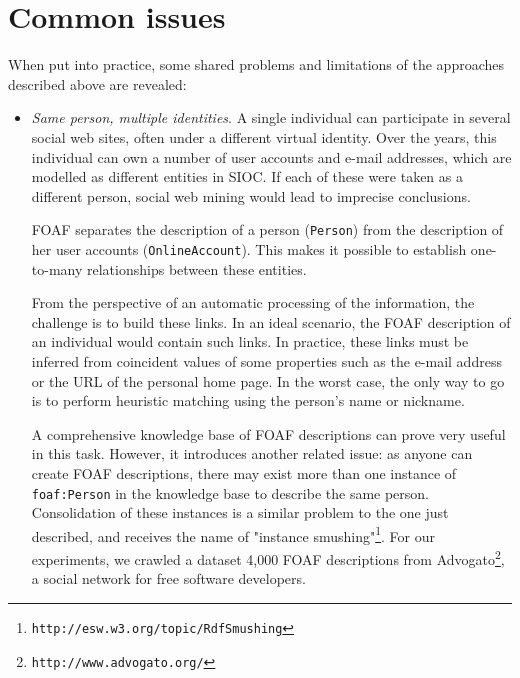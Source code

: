 \documentclass{../templates/www2008-submission}
\begin{document}
\section{Common issues}\label{sec:problems}

When put into practice, some shared problems and limitations
of the approaches described above are revealed:

\begin{itemize}
  \item \emph{Same person, multiple identities}. A single individual can
        participate in several social web sites, often under a different
        virtual identity. Over the years, this individual can own a
        number of user accounts and e-mail addresses, which are modelled
        as different entities in SIOC. If each of these were taken as
        a different person, social web mining would lead to imprecise
        conclusions.

        FOAF separates the description of a person
        (\texttt{Person})
        from the description of her user accounts (\texttt{OnlineAccount}).
        This makes it possible to establish one-to-many relationships
        between these entities.


        From the perspective of an automatic processing of the
        information, the challenge is to build these links. In an
        ideal scenario, the FOAF description of an individual would
        contain such links. In practice, these links must be
        inferred from coincident values of some properties such
        as the e-mail address or the URL of the personal home page.
        In the worst case, the only way to go is to perform heuristic matching
        using the person's name or nickname.

        A comprehensive knowledge base of FOAF descriptions can prove
        very useful in this task. However, it introduces another related issue:
        as anyone can create FOAF descriptions, there may exist more than
        one instance of \texttt{foaf:Person} in the knowledge base
        to describe the same person.
        Consolidation of these instances is a similar problem to the
        one just described, and receives the name of "instance
        smushing"\footnote{\texttt{http://esw.w3.org/topic/RdfSmushing}}.
        For our experiments, we crawled a dataset 4,000 FOAF descriptions
        from Advogato\footnote{\texttt{http://www.advogato.org/}}, a social
        network for free software developers.


\end{itemize}
\end{document}
